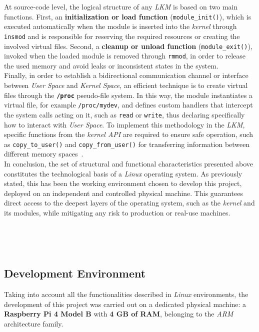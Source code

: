 At source-code level, the logical structure of any \textit{LKM} is based on two main functions.
First, an \textbf{initialization or load function} (\texttt{module\_init()}), which is executed automatically when the module is inserted into the \textit{kernel} through \texttt{insmod} and is responsible for reserving the required resources or creating the involved virtual files.
Second, a \textbf{cleanup or unload function} (\texttt{module\_exit()}), invoked when the loaded module is removed through \texttt{rmmod}, in order to release the used memory and avoid leaks or inconsistent states in the system.\\

Finally, in order to establish a bidirectional communication channel or interface between \textit{User Space} and \textit{Kernel Space}, an efficient technique is to create virtual files through the \textbf{\texttt{/proc}} pseudo-file system.
In this way, the module instantiates a virtual file, for example \texttt{/proc/mydev}, and defines custom handlers that intercept the system calls acting on it, such as \texttt{read} or \texttt{write}, thus declaring specifically how to interact with \textit{User Space}.
To implement this methodology in the \textit{LKM}, specific functions from the \textit{kernel API} are required to ensure safe operation, such as \texttt{copy\_to\_user()} and \texttt{copy\_from\_user()} for transferring information between different memory spaces~\cite{medium_proc}.\\

In conclusion, the set of structural and functional characteristics presented above constitutes the technological basis of a \textit{Linux} operating system.
As previously stated, this has been the working environment chosen to develop this project, deployed on an independent and controlled physical machine.
This guarantees direct access to the deepest layers of the operating system, such as the \textit{kernel} and its modules, while mitigating any risk to production or real-use machines.

\

\

\subsection{Development Environment}
\label{sec:denv}

Taking into account all the functionalities described in \textit{Linux} environments, the development of this project was carried out on a dedicated physical machine: a \textbf{Raspberry Pi 4 Model B} with \textbf{4 GB of RAM}, belonging to the \textit{ARM} architecture family.\\

